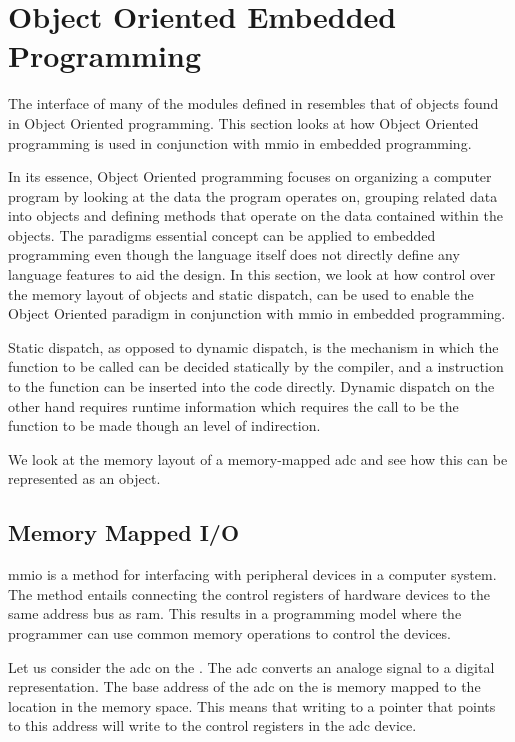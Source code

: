 \section{Object Oriented Embedded Programming}
\label{sec:impl:oo}

The interface of many of the modules defined in {\emlib} resembles that of objects found in Object Oriented programming.
This section looks at how Object Oriented programming is used in conjunction with \gls{mmio} in embedded programming.

In its essence, Object Oriented programming focuses on organizing a computer program by looking at the data the program operates on, grouping related data into objects and defining methods that operate on the data contained within the objects.
The paradigms essential concept can be applied to embedded {\C} programming even though the language itself does not directly define any language features to aid the design.
In this section, we look at how control over the memory layout of objects and static dispatch, can be used to enable the Object Oriented paradigm in conjunction with \gls{mmio} in embedded programming.

Static dispatch, as opposed to dynamic dispatch, is the mechanism in which the function to be called can be decided statically by the compiler, and a  instruction to the function can be inserted into the code directly.
Dynamic dispatch on the other hand requires runtime information which requires the call to be the function to be made though an level of indirection.

We look at the memory layout of a memory-mapped \gls{adc} and see how this can be represented as an object.

\subsection{Memory Mapped I/O}
\label{ssec:memory_mapped_io}

\gls{mmio} is a method for interfacing with peripheral devices in a computer system.
The method entails connecting the control registers of hardware devices to the same address bus as \gls{ram}.
This results in a programming model where the programmer can use common memory operations to control the devices.

Let us consider the \gls{adc} on the {\gecko}.
The \gls{adc} converts an analoge signal to a digital representation.
The base address of the \gls{adc} on the {\gecko} is memory mapped to the location  in the memory space.
This means that writing to a pointer that points to this address will write to the control registers in the \gls{adc} device.

